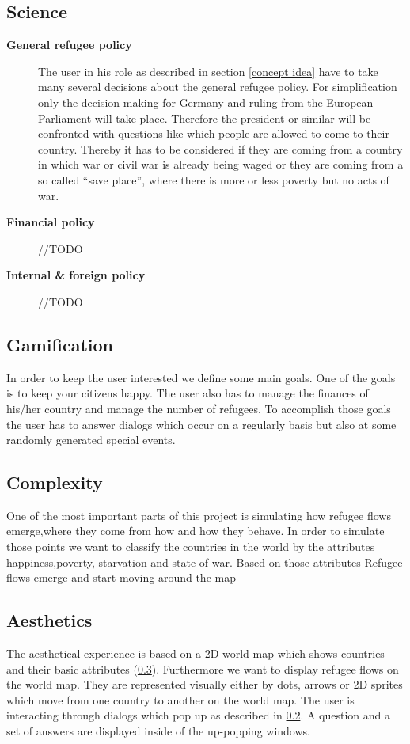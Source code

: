 \documentclass{acm_proc_article-sp}
\begin{document}
\subsection{Science}
\begin{description}

\item[\textbf{General refugee policy}]
The user in his role as described in section \ref{concept idea} have to take many several decisions about the general refugee policy. For simplification only the decision-making for Germany and ruling from the European Parliament will take place. Therefore the president or similar will be confronted with questions like which people are allowed to come to their country. Thereby it has to be considered if they are coming from a country in which war or civil war is already being waged or they are coming from a so called ``save place'', where there is more or less poverty but no acts of war. 

\item[\textbf{Financial policy}] //TODO


\item[\textbf{Internal \& foreign policy}] //TODO

\end{description}
\subsection{Gamification}
\label{gamification}
In order to keep the user interested we define some main goals. One of the goals is to keep your citizens happy. The user also has to manage the finances of his/her country and manage the number of refugees. To accomplish those goals the user has to answer dialogs which occur on a regularly basis but also at some randomly generated special events. 
\subsection{Complexity}
\label{complexity}
One of the most important parts of this project is simulating how refugee flows emerge,where they come from how and how they behave. In order to simulate those points we want to classify the countries in the world by the attributes happiness,poverty, starvation and state of war. Based on those attributes Refugee flows emerge and start moving around the map
\subsection{Aesthetics}
The aesthetical experience is based on a 2D-world map which shows countries and their basic attributes (\ref{complexity}). Furthermore we want to display refugee flows on the world map. They are represented visually  either  by dots, arrows or 2D sprites which move from one country to another on the world map. The user is interacting through dialogs which pop up as described in \ref{gamification}. A question and a set of answers are displayed inside of the up-popping windows.
\end{document}

